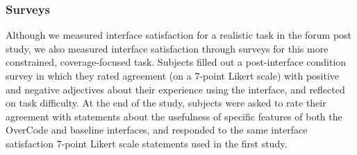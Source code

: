 \subsubsection{Surveys} 
Although we measured interface satisfaction for a realistic task in the forum post study, we also measured interface satisfaction through surveys for this more constrained, coverage-focused task. Subjects filled out a post-interface condition survey in which they rated agreement (on a 7-point Likert scale) with positive and negative adjectives about their experience using the interface, and reflected on task difficulty. At the end of the study, subjects were asked to rate their agreement with statements about the usefulness of specific features of both the OverCode and baseline interfaces, and responded to the same interface satisfaction 7-point Likert scale statements used in the first study.

